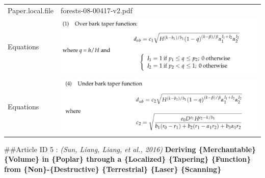 \documentclass[]{article}
\begin{document}
\begin{longtable}[]{@{}ll@{}}
\begin{minipage}[t]{0.21\columnwidth}
Paper.local.file\strut
\end{minipage} & \begin{minipage}[t]{0.73\columnwidth}\raggedright
forests-08-00417-v2.pdf\strut
\end{minipage}\tabularnewline
\begin{minipage}[t]{0.21\columnwidth}\raggedright
Equations\strut
\end{minipage} & \begin{minipage}[t]{0.73\columnwidth}\raggedright
\includegraphics{Equations/2017Corral-RivasEtAlOb.png}\strut
\end{minipage}\tabularnewline
\begin{minipage}[t]{0.21\columnwidth}\raggedright
Equations\strut
\end{minipage} & \begin{minipage}[t]{0.73\columnwidth}\raggedright
\includegraphics{Equations/2017Corral-RivasEtAlUb.png}\strut
\end{minipage}\tabularnewline
\bottomrule
\end{longtable}

\#\#Article ID 5 : \emph{(Sun, Liang, Liang, et al., 2016)}
\textbf{Deriving \{Merchantable\} \{Volume\} in \{Poplar\} through a
\{Localized\} \{Tapering\} \{Function\} from \{Non\}-\{Destructive\}
\{Terrestrial\} \{Laser\} \{Scanning\}}
\end{document}
